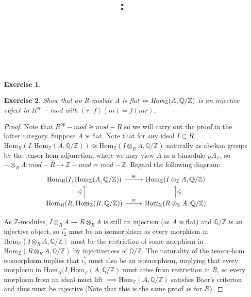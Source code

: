 \documentclass{article}
\title{
    \vspace{2in}
    \textmd{\textbf{\hmwkClass:\ \hmwkTitle}}\\
    \vspace{0.1in}
    \textmd{\hmwkDueDate} \\
    \vspace{0.2in}\large{\textit{\hmwkClassInstructor\  }}
    \vspace{2in}
}
\author{\hmwkAuthorName}
\date{}
\newcommand{\Hom}{\text{Hom}}
\newcommand{\bb}[1]{\mathbb{#1}}
\newtheorem{exercise}{Exercise}
\begin{document}
\maketitle
\newpage

\begin{exercise}
  
\end{exercise}


\begin{exercise}
 Show that an R-module A is flat $\Leftrightarrow \text{\emph{Hom}}_{\bb{Z}}(A, \bb{Q}/\bb{Z})$ is an injective object in $R^{op}-mod$ with $(r \cdot f)(m) = f(mr)$.
\end{exercise}

\begin{proof}
  Note that $R^{op}-mod \cong mod-R$ so we will carry out the proof in the latter category. Suppose $A$ is flat. Note that for any ideal $I \subset R$, $\Hom_{R}(I, \Hom_{\bb{Z}}(A,\bb{Q}/\bb{Z})) \cong \Hom_{\bb{Z}}(I \otimes_{R} A, \bb{Q/Z})$ naturally as abelian groups by the tensor-hom adjunction, where we may view $A$ as a bimodule $_{R}A_{\bb{Z}}$, so $ - \otimes_{R} A : mod-R \to \bb{Z}-mod = mod-\bb{Z}$. Regard the following diagram:
  \[
    \begin{tikzcd}
\Hom_{R}(I, \Hom_{\bb{Z}}(A,\bb{Q/Z})) \arrow[r, "\cong"]                    &  \Hom_{\bb{Z}}(I \otimes_{\bb{Z}} A, \bb{Q/Z})                     \\
\Hom_{R}(R, \Hom_{\bb{Z}}(R,\bb{Q/Z})) \arrow[u, "i^{*}_{1}"] \arrow[r, "\cong"] & \Hom_{\bb{Z}}(R \otimes_{\bb{Z}} A, \bb{Q/Z}) \arrow[u, "i^{*}_{2}"']
\end{tikzcd}
\]

As $\bb{Z}$-modules, $I \otimes_{R} A \to R \otimes_{R} A$ is still an injection (as $A$ is flat) and $\bb{Q/Z}$ is an injective object, so $i^{*}_{2}$ must be an isomorphism as every morphism in $\Hom_{\bb{Z}}(I \otimes_{R} A,\bb{Q/Z})$ must be the restriction of some morphism in $\Hom_{\bb{Z}}(R \otimes_{R} A,\bb{Q/Z})$ by injectiveness of $\bb{Q/Z}$. The naturality of the tensor-hom isomorphism implies that $i^{*}_{1}$ must also be an isomorphism, implying that every morphism in $\Hom_{R}(I, \Hom_{\bb{Z}}(A,\bb{Q/Z})$ must arise from restriction in $R$, so every morphism from an ideal must lift $\implies \Hom_{\bb{Z}}(A,\bb{Q/Z})$ satisfies Baer's criterion and thus must be injective (Note that this is the same proof as for $R$). 


\end{proof}
\end{document}
